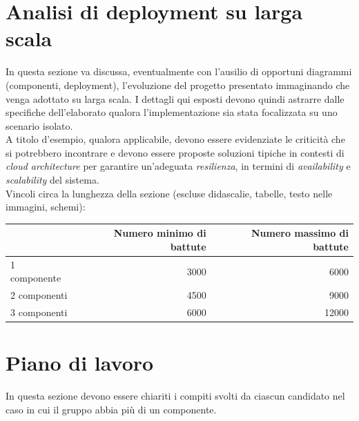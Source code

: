 \documentclass[12pt]{article}
\begin{document}
\newpage



\section{Analisi di deployment su larga scala}

In questa sezione va discussa, eventualmente con l'ausilio di opportuni diagrammi (componenti, deployment), l'evoluzione del progetto presentato immaginando che venga adottato su larga scala. I dettagli qui esposti devono quindi astrarre dalle specifiche dell'elaborato qualora l'implementazione sia stata focalizzata su uno scenario isolato.\\

A titolo d’esempio, qualora applicabile, devono essere evidenziate le criticità che si potrebbero incontrare e devono essere proposte soluzioni tipiche in contesti di \textit{cloud architecture} per garantire un'adeguata \textit{resilienza}, in termini di \textit{availability} e \textit{scalability} del sistema.\\


Vincoli circa la lunghezza della sezione (escluse didascalie, tabelle, testo nelle immagini, schemi):

\vspace{1cm}
\begin{tabular}{l|rr}
 & Numero minimo di battute & Numero massimo di battute \\
 \hline
 1 componente & 3000 & 6000 \\
 2 componenti & 4500 & 9000 \\
 3 componenti & 6000 & 12000 \\
 \hline
\end{tabular}


\newpage



\section{Piano di lavoro}

In questa sezione devono essere chiariti i compiti svolti da ciascun candidato nel caso in cui il gruppo abbia più di un componente.\\
\end{document}
